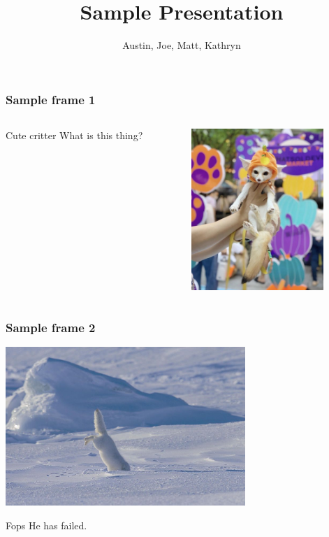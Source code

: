 \documentclass{beamer}
\title{Sample Presentation}
\author{Austin, Joe, Matt, Kathryn}
\institute{SNHU/CETA}
\begin{document}
\frame{\titlepage} %

\begin{frame}
\frametitle{Sample frame 1}

\begin{columns}
    \begin{column}{0.48\textwidth}
        \begin{block}{Cute critter}
            What is this thing?
        \end{block}
    \end{column}
    \begin{column}{0.48\textwidth}
        \includegraphics[width=5cm]{what_is_this_thing}
    \end{column}
\end{columns}

\end{frame}


\begin{frame}
\frametitle{Sample frame 2}

\includegraphics[height=6cm]{pounce}

\begin{block}{Fops}
    He has failed.
\end{block}

\end{frame}
\end{document}
